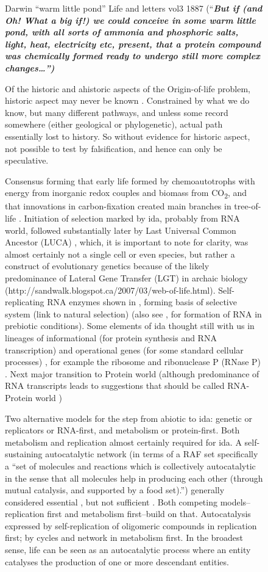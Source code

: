 \begin{figure}
\begin{framed}
Darwin ``warm little pond'' Life and letters vol3 1887
(``\emph{\textbf{But if (and Oh! What a big if!) we could conceive in
	some warm little pond, with all sorts of ammonia and phosphoric salts,
	light, heat, electricity etc, present, that a protein compound was
	chemically formed ready to undergo still more complex
	changes\ldots{}'')}} \autocite{Vasas2012}


Of the historic and ahistoric aspects of the Origin-of-life problem,
historic aspect may never be known \autocite{Pross2013}. Constrained by
what we do know, but many different pathways, and unless some record
somewhere (either geological or phylogenetic), actual path essentially
lost to history. So without evidence for historic aspect, not possible
to test by falsification, and hence can only be speculative.

Consensus forming that early life formed by chemoautotrophs with energy
from inorganic redox couples and biomass from CO\textsubscript{2}, and
that innovations in carbon-fixation created main branches in
tree-of-life \autocite{Braakman2012}. Initiation of selection marked by
\gls{ida}, probably from RNA world, followed substantially later by Last
Universal Common Ancestor (LUCA) \autocite{Yarus2011}, which, it is
important to note for clarity, was almost certainly not a single cell or
even species, but rather a construct of evolutionary genetics because of
the likely predominance of Lateral Gene Transfer (LGT) in archaic
biology (http://sandwalk.blogspot.ca/2007/03/web-of-life.html).
Self-replicating RNA enzymes shown in \autocite{Lincoln2009}, forming
basis of selective system (link to natural selection) (also see
\autocite{Cheng2010}, \autocite{Powner2009} for formation of RNA in
prebiotic conditions). Some elements of \gls{ida} thought still with us
in lineages of informational (for protein synthesis and RNA
transcription) and operational genes (for some standard cellular
processes) \autocite{Ragan2009}, for example the ribosome and
ribonuclease P (RNase P) \autocite{Wilson2009}. Next major transition to
Protein world (although predominance of RNA transcripts leads to
suggestions that should be called RNA-Protein world
\autocite{Altman2013})

Two alternative models for the step from abiotic to \gls{ida}: genetic
or replicators or RNA-first, and metabolism or protein-first. Both
metabolism and replication almost certainly required for \gls{ida}. A
self-sustaining autocatalytic network (in terms of a RAF set
specifically a ``set of molecules and reactions which is collectively
autocatalytic in the sense that all molecules help in producing each
other (through mutual catalysis, and supported by a food set).'')
generally considered essential \autocite{Pross2013}, but not sufficient
\autocite{Hordijk2011}. Both competing models--replication first and
metabolism first--build on that. Autocatalysis expressed by
self-replication of oligomeric compounds in replication first; by cycles
and network in metabolism first. In the broadest sense, life can be seen
as an autocatalytic process where an entity catalyses the production of
one or more descendant entities.


\end{framed}
\end{figure}

